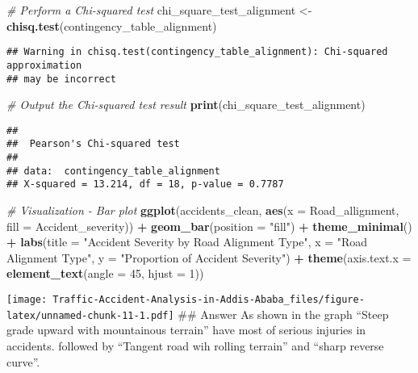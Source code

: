 \documentclass[
]{article}
\newenvironment{Shaded}{\begin{snugshade}}{\end{snugshade}}
\newcommand{\AttributeTok}[1]{\textcolor[rgb]{0.13,0.29,0.53}{#1}}
\newcommand{\CommentTok}[1]{\textcolor[rgb]{0.56,0.35,0.01}{\textit{#1}}}
\newcommand{\DecValTok}[1]{\textcolor[rgb]{0.00,0.00,0.81}{#1}}
\newcommand{\FunctionTok}[1]{\textcolor[rgb]{0.13,0.29,0.53}{\textbf{#1}}}
\newcommand{\NormalTok}[1]{#1}
\newcommand{\OtherTok}[1]{\textcolor[rgb]{0.56,0.35,0.01}{#1}}
\newcommand{\SpecialCharTok}[1]{\textcolor[rgb]{0.81,0.36,0.00}{\textbf{#1}}}
\newcommand{\StringTok}[1]{\textcolor[rgb]{0.31,0.60,0.02}{#1}}
\begin{document}
\begin{Shaded}
\begin{Highlighting}[]
\CommentTok{\# Perform a Chi{-}squared test}
\NormalTok{chi\_square\_test\_alignment }\OtherTok{\textless{}{-}} \FunctionTok{chisq.test}\NormalTok{(contingency\_table\_alignment)}
\end{Highlighting}
\end{Shaded}

\begin{verbatim}
## Warning in chisq.test(contingency_table_alignment): Chi-squared approximation
## may be incorrect
\end{verbatim}

\begin{Shaded}
\begin{Highlighting}[]
\CommentTok{\# Output the Chi{-}squared test result}
\FunctionTok{print}\NormalTok{(chi\_square\_test\_alignment)}
\end{Highlighting}
\end{Shaded}

\begin{verbatim}
## 
##  Pearson's Chi-squared test
## 
## data:  contingency_table_alignment
## X-squared = 13.214, df = 18, p-value = 0.7787
\end{verbatim}

\begin{Shaded}
\begin{Highlighting}[]
\CommentTok{\# Visualization {-} Bar plot}
\FunctionTok{ggplot}\NormalTok{(accidents\_clean, }\FunctionTok{aes}\NormalTok{(}\AttributeTok{x =}\NormalTok{ Road\_allignment, }\AttributeTok{fill =}\NormalTok{ Accident\_severity)) }\SpecialCharTok{+}
  \FunctionTok{geom\_bar}\NormalTok{(}\AttributeTok{position =} \StringTok{"fill"}\NormalTok{) }\SpecialCharTok{+}
  \FunctionTok{theme\_minimal}\NormalTok{() }\SpecialCharTok{+}
  \FunctionTok{labs}\NormalTok{(}\AttributeTok{title =} \StringTok{"Accident Severity by Road Alignment Type"}\NormalTok{,}
       \AttributeTok{x =} \StringTok{"Road Alignment Type"}\NormalTok{, }\AttributeTok{y =} \StringTok{"Proportion of Accident Severity"}\NormalTok{) }\SpecialCharTok{+}
  \FunctionTok{theme}\NormalTok{(}\AttributeTok{axis.text.x =} \FunctionTok{element\_text}\NormalTok{(}\AttributeTok{angle =} \DecValTok{45}\NormalTok{, }\AttributeTok{hjust =} \DecValTok{1}\NormalTok{))}
\end{Highlighting}
\end{Shaded}

\texttt{[image: Traffic-Accident-Analysis-in-Addis-Ababa\_files/figure-latex/unnamed-chunk-11-1.pdf]}
\#\# Answer As shown in the graph ``Steep grade upward with mountainous
terrain'' have most of serious injuries in accidents. followed by
``Tangent road wih rolling terrain'' and ``sharp reverse curve''.
\end{document}
